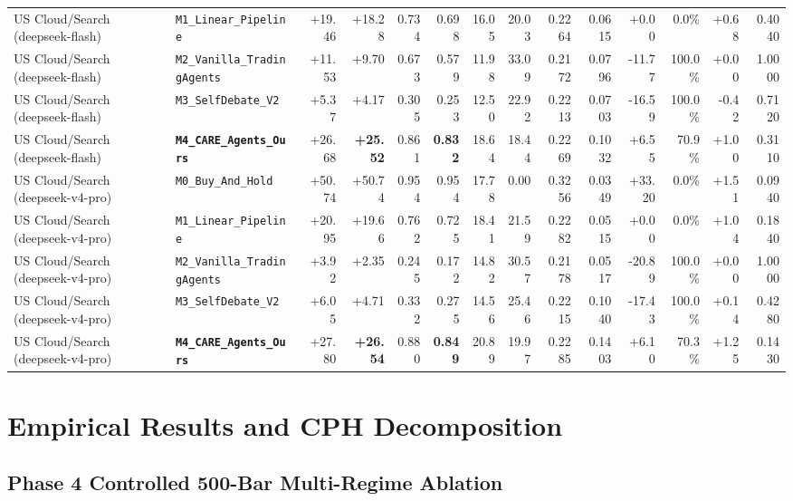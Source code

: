 \documentclass[10pt,a4paper,twocolumn]{article}
\begin{document}
\begin{table}[t]
{\begin{tabular}{llrrrrrrrrrrrr}
US Cloud/Search (deepseek-flash) & \texttt{M1\_Linear\_Pipeline} & +19.46 & +18.28 & 0.734 & 0.698 & 16.05 & 20.03 & 0.2264 & 0.0615 & +0.00 & 0.0\% & +0.68 & 0.4040 \\
US Cloud/Search (deepseek-flash) & \texttt{M2\_Vanilla\_TradingAgents} & +11.53 & +9.70 & 0.673 & 0.579 & 11.98 & 33.09 & 0.2172 & 0.0796 & -11.77 & 100.0\% & +0.00 & 1.0000 \\
US Cloud/Search (deepseek-flash) & \texttt{M3\_SelfDebate\_V2} & +5.37 & +4.17 & 0.305 & 0.253 & 12.50 & 22.92 & 0.2213 & 0.0703 & -16.59 & 100.0\% & -0.42 & 0.7120 \\
US Cloud/Search (deepseek-flash) & \textbf{\texttt{M4\_CARE\_Agents\_Ours}} & +26.68 & \textbf{+25.52} & 0.861 & \textbf{0.832} & 18.64 & 18.44 & 0.2269 & 0.1032 & +6.55 & 70.9\% & +1.00 & 0.3110 \\
\midrule
US Cloud/Search (deepseek-v4-pro) & \texttt{M0\_Buy\_And\_Hold} & +50.74 & +50.74 & 0.954 & 0.954 & 17.78 & 0.00 & 0.3256 & 0.0349 & +33.20 & 0.0\% & +1.51 & 0.0940 \\
US Cloud/Search (deepseek-v4-pro) & \texttt{M1\_Linear\_Pipeline} & +20.95 & +19.66 & 0.762 & 0.725 & 18.41 & 21.59 & 0.2282 & 0.0515 & +0.00 & 0.0\% & +1.04 & 0.1840 \\
US Cloud/Search (deepseek-v4-pro) & \texttt{M2\_Vanilla\_TradingAgents} & +3.92 & +2.35 & 0.245 & 0.172 & 14.82 & 30.57 & 0.2178 & 0.0517 & -20.89 & 100.0\% & +0.00 & 1.0000 \\
US Cloud/Search (deepseek-v4-pro) & \texttt{M3\_SelfDebate\_V2} & +6.05 & +4.71 & 0.332 & 0.275 & 14.56 & 25.46 & 0.2215 & 0.1040 & -17.43 & 100.0\% & +0.14 & 0.4280 \\
US Cloud/Search (deepseek-v4-pro) & \textbf{\texttt{M4\_CARE\_Agents\_Ours}} & +27.80 & \textbf{+26.54} & 0.880 & \textbf{0.849} & 20.89 & 19.97 & 0.2285 & 0.1403 & +6.10 & 70.3\% & +1.25 & 0.1430 \\
\bottomrule
\end{tabular}%
}
\end{table}

\section{Empirical Results and CPH Decomposition}

\subsection{Phase 4 Controlled 500-Bar Multi-Regime Ablation}
\end{document}

